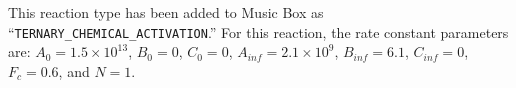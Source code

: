 \documentclass[titlepage]{article}
\begin{document}
This reaction type has been added to Music Box as ``\verb>TERNARY_CHEMICAL_ACTIVATION>.'' For this reaction, the rate constant parameters are: $A_0 = 1.5 \times 10^{13}$, $B_0 = 0$, $C_0 = 0$, $A_{inf} = 2.1 \times 10^9$, $B_{inf} = 6.1$, $C_{inf} = 0$, $F_c = 0.6$, and $N = 1$.

\end{document}
